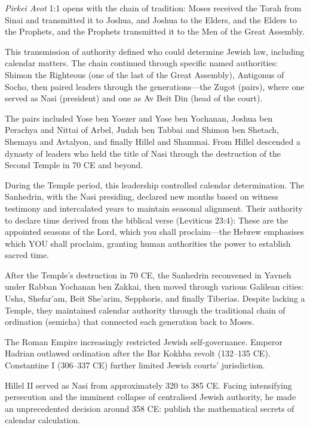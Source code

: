 \begin{historical}
\textit{Pirkei Avot} 1:1 opens with the chain of tradition: \QSOpen{}Moses received the Torah from Sinai and transmitted it to Joshua, and Joshua to the Elders, and the Elders to the Prophets, and the Prophets transmitted it to the Men of the Great Assembly.\QSClose{}

This transmission of authority defined who could determine Jewish law, including calendar matters. The chain continued through specific named authorities: Shimon the Righteous (one of the last of the Great Assembly), Antigonus of Socho, then paired leaders through the generations—the Zugot (pairs), where one served as Nasi (president) and one as Av Beit Din (head of the court).

The pairs included Yose ben Yoezer and Yose ben Yochanan, Joshua ben Perachya and Nittai of Arbel, Judah ben Tabbai and Shimon ben Shetach, Shemaya and Avtalyon, and finally Hillel and Shammai. From Hillel descended a dynasty of leaders who held the title of Nasi through the destruction of the Second Temple in 70 CE and beyond.

During the Temple period, this leadership controlled calendar determination. The Sanhedrin, with the Nasi presiding, declared new months based on witness testimony and intercalated years to maintain seasonal alignment. Their authority to declare time derived from the biblical verse (Leviticus 23:4): \QSOpen{}These are the appointed seasons of the Lord, which you shall proclaim\QSClose{}—the Hebrew emphasises \QSOpen{}which YOU shall proclaim,\QSClose{} granting human authorities the power to establish sacred time.

After the Temple's destruction in 70 CE, the Sanhedrin reconvened in Yavneh under Rabban Yochanan ben Zakkai, then moved through various Galilean cities: Usha, Shefar'am, Beit She'arim, Sepphoris, and finally Tiberias. Despite lacking a Temple, they maintained calendar authority through the traditional chain of ordination (semicha) that connected each generation back to Moses.

The Roman Empire increasingly restricted Jewish self-governance. Emperor Hadrian outlawed ordination after the Bar Kokhba revolt (132–135 CE). Constantine I (306–337 CE) further limited Jewish courts' jurisdiction.

Hillel II served as Nasi from approximately 320 to 385 CE. Facing intensifying persecution and the imminent collapse of centralised Jewish authority, he made an unprecedented decision around 358 CE: publish the mathematical secrets of calendar calculation.
\end{historical}